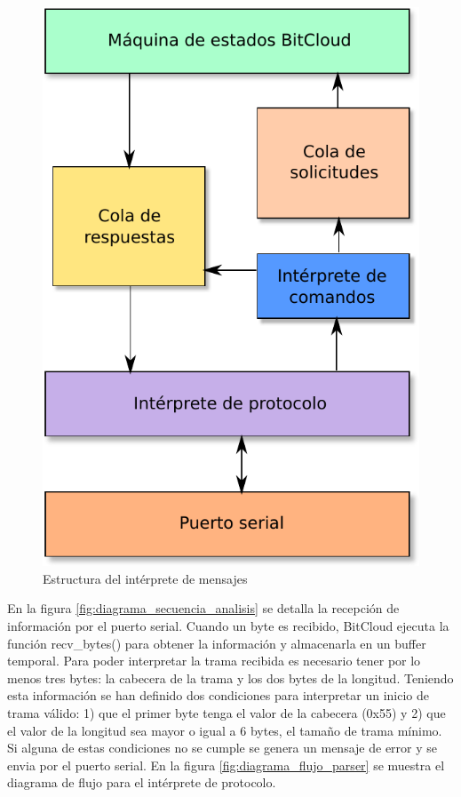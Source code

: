 \begin{figure}
	\centering
	\includegraphics[scale=0.5]{capitulo_3_imgs/estructura_interprete.pdf}
	\caption{Estructura del intérprete de mensajes}
	\label{fig:interprete_mensajes}
\end{figure}

En la figura \ref{fig:diagrama_secuencia_analisis} se detalla la recepción de información por el puerto serial. Cuando un byte es recibido, BitCloud ejecuta la función recv\_bytes() para obtener la información y almacenarla en un buffer temporal. Para poder interpretar la trama recibida es necesario tener por lo menos tres bytes: la cabecera de la trama y los dos bytes de la longitud. Teniendo esta información se han definido dos condiciones para interpretar un inicio de trama válido: 1) que el primer byte tenga el valor de la cabecera (0x55) y 2) que el valor de la longitud sea mayor o igual a 6 bytes, el tamaño de trama mínimo. Si alguna de estas condiciones no se cumple se genera un mensaje de error y se envia por el puerto serial. En la figura \ref{fig:diagrama_flujo_parser} se muestra el diagrama de flujo para el intérprete de protocolo.

